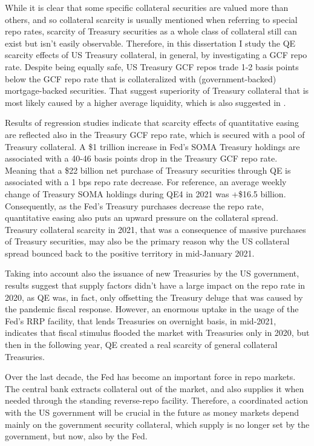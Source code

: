 \documentclass[11pt,a4paper,english,oneside]{article}
\begin{document}
While it is clear that some specific collateral securities are valued more than others, and so collateral scarcity is usually mentioned when referring to special repo rates, scarcity of Treasury securities as a whole class of collateral still can exist but isn't easily observable. Therefore, in this dissertation I study the QE scarcity effects of US Treasury collateral, in general, by investigating a GCF repo rate. Despite being equally safe, US Treasury GCF repos trade 1-2 basis points below the GCF repo rate that is collateralized with (government-backed) mortgage-backed securities. That suggest superiority of Treasury collateral that is most likely caused by a higher average liquidity, which is also suggested in \citet{krishnamurthy2012}.

Results of regression studies indicate that scarcity effects of quantitative easing are reflected also in the Treasury GCF repo rate, which is secured with a pool of Treasury collateral. A \$1 trillion increase in Fed's SOMA Treasury holdings are associated with a 40-46 basis points drop in the Treasury GCF repo rate. Meaning that a \$22 billion net purchase of Treasury securities through QE is associated with a 1 bps repo rate decrease. For reference, an average weekly change of Treasury SOMA holdings during QE4 in 2021 was +\$16.5 billion. Consequently, as the Fed's Treasury purchases decrease the repo rate, quantitative easing also puts an upward pressure on the collateral spread. Treasury collateral scarcity in 2021, that was a consequence of massive purchases of Treasury securities, may also be the primary reason why the US collateral spread bounced back to the positive territory in mid-January 2021.

Taking into account also the issuance of new Treasuries by the US government, results suggest that supply factors didn't have a large impact on the repo rate in 2020, as QE was, in fact, only offsetting the Treasury deluge that was caused by the pandemic fiscal response. However, an enormous uptake in the usage of the Fed's RRP facility, that lends Treasuries on overnight basis, in mid-2021, indicates that fiscal stimulus flooded the market with Treasuries only in 2020, but then in the following year, QE created a real scarcity of general collateral Treasuries.

Over the last decade, the Fed has become an important force in repo markets. The central bank extracts collateral out of the market, and also supplies it when needed through the standing reverse-repo facility. Therefore, a coordinated action with the US government will be crucial in the future as money markets depend mainly on the government security collateral, which supply is no longer set by the government, but now, also by the Fed. 
\end{document}
